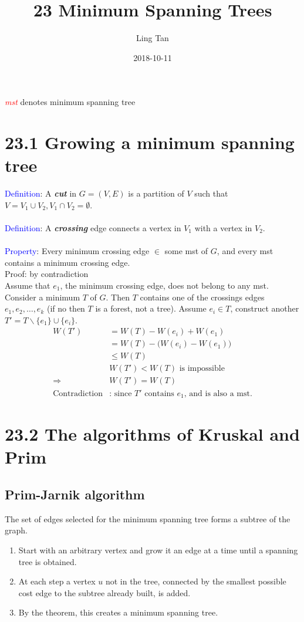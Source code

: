 \documentclass[a4paper]{article}
\title{23 Minimum Spanning Trees}
\author{Ling Tan}
\date{2018-10-11}
\begin{document}
\maketitle
\textcolor{red}{\textit{mst}} denotes minimum spanning tree
\section*{23.1 Growing a minimum spanning tree}

\textcolor{blue}{Definition}: A \textbf{\textit{cut}} in $G=(V,E)$ is a partition of $V$ such that $V=V_1\cup V_2, V_1\cap V_2=\emptyset$. \\
\\
\textcolor{blue}{Definition}: A \textbf{\textit{crossing}} edge connects a vertex in $V_1$ with a vertex in $V_2$.\\
\\
\textcolor{blue}{Property}: Every minimum crossing edge $\in$ some mst of $G$, and every mst contains a minimum crossing edge.\\
Proof: by contradiction\\
Assume that $e_1$, the minimum crossing edge, does not belong to any mst. Consider a minimum $T$ of $G$. Then $T$ contains one of the crossings edges $e_1,e_2,\ldots, e_k$ (if no then $T$ is a forest, not a tree). Assume $e_i\in T$, construct another $T'=T \backslash \{e_1\}\cup \{e_i\}$.
\begin{align*}
W(T')&=W(T)-W(e_i)+W(e_1)\\
&= W(T)-\big(W(e_i)-W(e_1)\big)\\
&\leq W(T) \\
&W(T')<W(T)\text{ is impossible}\\
\Rightarrow &W(T')=W(T)\\
\text{Contradiction}&\text{: since $T'$ contains $e_1$, and is also a mst.} 
\end{align*}

\section*{23.2 The algorithms of Kruskal and Prim}

\subsection*{Prim-Jarnik algorithm}
The set of edges selected for the minimum spanning tree forms a subtree of the graph.
\begin{enumerate}
    \item Start with an arbitrary vertex and grow it an edge at a time until a spanning tree is obtained.
    \item At each step a vertex $u$ not in the tree, connected by the smallest possible cost edge to the subtree already built, is added.
    \item By the theorem, this creates a minimum spanning tree.
\end{enumerate}
\end{document}
